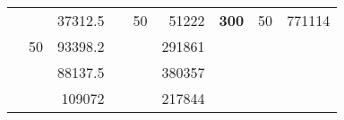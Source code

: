 \begin{table}[H]
\begin{tabular}{|ccrccrccc}
\rowcolor[HTML]{DDFDFF} 
\multicolumn{1}{|c|}{\cellcolor[HTML]{FFFFC7}}                                & \multicolumn{1}{c|}{\cellcolor[HTML]{DDFDFF}}                      & \multicolumn{1}{r|}{\cellcolor[HTML]{DAE8FC}37312.5}   & \multicolumn{1}{c|}{\cellcolor[HTML]{FFFFC7}}                                & \multicolumn{1}{c|}{\multirow{-10}{*}{\cellcolor[HTML]{DDFDFF}50}}  & \multicolumn{1}{r|}{\cellcolor[HTML]{DDFDFF}51222}     & \multicolumn{1}{c|}{\multirow{-19}{*}{\cellcolor[HTML]{FFFFC7}\textbf{300}}} & \multicolumn{1}{c|}{\multirow{-10}{*}{\cellcolor[HTML]{DDFDFF}50}} & \multicolumn{1}{r|}{\cellcolor[HTML]{DDFDFF}771114}    \\ \cline{3-3} \cline{5-9} 
\multicolumn{1}{|c|}{\cellcolor[HTML]{FFFFC7}}                                & \multicolumn{1}{c|}{\multirow{-10}{*}{\cellcolor[HTML]{DDFDFF}50}} & \multicolumn{1}{r|}{\cellcolor[HTML]{DDFDFF}93398.2}   & \multicolumn{1}{c|}{\cellcolor[HTML]{FFFFC7}}                                & \multicolumn{1}{c|}{\cellcolor[HTML]{DAE8FC}}                       & \multicolumn{1}{r|}{\cellcolor[HTML]{DAE8FC}291861}    &                                                                              &                                                                    &                                                        \\ \cline{2-3} \cline{6-6}
\multicolumn{1}{|c|}{\cellcolor[HTML]{FFFFC7}}                                & \multicolumn{1}{c|}{\cellcolor[HTML]{DAE8FC}}                      & \multicolumn{1}{r|}{\cellcolor[HTML]{DAE8FC}88137.5}   & \multicolumn{1}{c|}{\cellcolor[HTML]{FFFFC7}}                                & \multicolumn{1}{c|}{\cellcolor[HTML]{DAE8FC}}                       & \multicolumn{1}{r|}{\cellcolor[HTML]{DDFDFF}380357}    &                                                                              &                                                                    &                                                        \\ \cline{3-3} \cline{6-6}
\multicolumn{1}{|c|}{\cellcolor[HTML]{FFFFC7}}                                & \multicolumn{1}{c|}{\cellcolor[HTML]{DAE8FC}}                      & \multicolumn{1}{r|}{\cellcolor[HTML]{DDFDFF}109072}    & \multicolumn{1}{c|}{\cellcolor[HTML]{FFFFC7}}                                & \multicolumn{1}{c|}{\cellcolor[HTML]{DAE8FC}}                       & \multicolumn{1}{r|}{\cellcolor[HTML]{DAE8FC}217844}    &                                                                              &                                                                    &                                                        \\ \cline{3-3} \cline{6-6}

\end{tabular}
\end{table}
